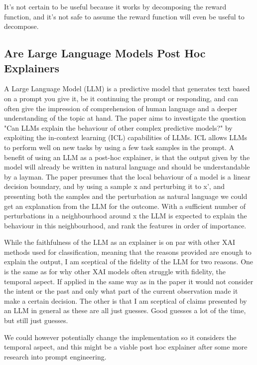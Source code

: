 \documentclass[UKenglish]{uiomasterthesis}
\begin{document}
It's not certain to be useful because it works by decomposing the reward function, and it's not safe to assume the reward function will even be useful to decompose.


\subsection{ Are Large Language Models Post Hoc Explainers}
A Large Language Model (LLM) is a predictive model that generates text based on a prompt you give it, be it continuing the prompt or responding, and can often give the impression of comprehension of human language and a deeper understanding of the topic at hand.  The paper aims to investigate the question "Can LLMs explain the behaviour of other complex predictive models?" by exploiting the in-context learning (ICL) capabilities of LLMs. ICL allows LLMs to perform well on new tasks by using a few task samples in the prompt. A benefit of using an LLM as a post-hoc explainer, is that the output given by the model will already be written in natural language and should be understandable by a layman. The paper presumes that the local behaviour of a model is a linear decision boundary, and by using a sample x and perturbing it to x', and presenting both the samples and the perturbation as natural language we could get an explanation from the LLM for the outcome. With a sufficient number of perturbations in a neighbourhood around x the LLM is expected to explain the behaviour in this neighbourhood, and rank the features in order of importance.

While the faithfulness of the LLM as an explainer is on par with other XAI methods used for classification, meaning that the reasons provided are enough to explain the output, I am sceptical of the fidelity of the LLM for two reasons. One is the same as for why other XAI models often struggle with fidelity, the temporal aspect. If applied in the same way as in the paper it would not consider the intent or the past and only what part of the current observation made it make a certain decision. The other is that I am sceptical of claims presented by an LLM in general as these are all just guesses. Good guesses a lot of the time, but still just guesses. 

We could however potentially change the implementation so it considers the temporal aspect, and this might be a viable post hoc explainer after some more research into prompt engineering.
\end{document}
